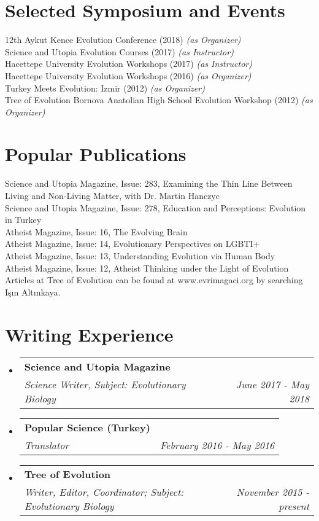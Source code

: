\documentclass[letterpaper,11pt]{article}
\makeatletter
\newcommand{\resumeSubheading}[4]{
  \vspace{-1pt}\item
    \begin{tabular*}{0.97\textwidth}{l@{\extracolsep{\fill}}r}
      \textbf{#1} & #2 \\
      \textit{\small#3} & \textit{\small #4} \\
    \end{tabular*}\vspace{-5pt}
}
\newcommand{\resumeSubHeadingListStart}{\begin{itemize}[leftmargin=*]}
\newcommand{\resumeSubHeadingListEnd}{\end{itemize}}
\makeatother
\begin{document}
\section{Selected Symposium and Events}
12th Aykut Kence Evolution Conference (2018) \textit{(as Organizer)} \\
Science and Utopia Evolution Courses (2017) \textit{(as Instructor)} \\
Hacettepe University Evolution Workshops (2017) \textit{(as Instructor)} \\
Hacettepe University Evolution Workshops (2016) \textit{(as Organizer)} \\
Turkey Meets Evolution: Izmir (2012) \textit{(as Organizer)} \\
Tree of Evolution Bornova Anatolian High School Evolution Workshop (2012) \textit{(as Organizer)} \\


\section{Popular Publications}
Science and Utopia Magazine, Issue: 283, Examining the Thin Line Between Living and Non-Living Matter, with Dr. Martin Hanczyc \\
Science and Utopia Magazine, Issue: 278, Education and Perceptions: Evolution in Turkey \\
Atheist Magazine, Issue: 16, The Evolving Brain \\
Atheist Magazine, Issue: 14, Evolutionary Perspectives on LGBTI+ \\
Atheist Magazine, Issue: 13, Understanding Evolution via Human Body \\
Atheist Magazine, Issue: 12, Atheist Thinking under the Light of Evolution \\
Articles at Tree of Evolution can be found at www.evrimagaci.org by searching I\c{s}{\i}n Alt{\i}nkaya. 

\section{Writing Experience}
  \resumeSubHeadingListStart
    \resumeSubheading
      {Science and Utopia Magazine}{ }
      {Science Writer, Subject: Evolutionary Biology}{June 2017 - May 2018}
    \resumeSubheading
      {Popular Science (Turkey)}{ }
      {Translator}{February 2016 - May 2016}
    \resumeSubheading
      {Tree of Evolution}{ }
      {Writer, Editor, Coordinator; Subject: Evolutionary Biology}{November 2015 - present}
  \resumeSubHeadingListEnd
\end{document}
